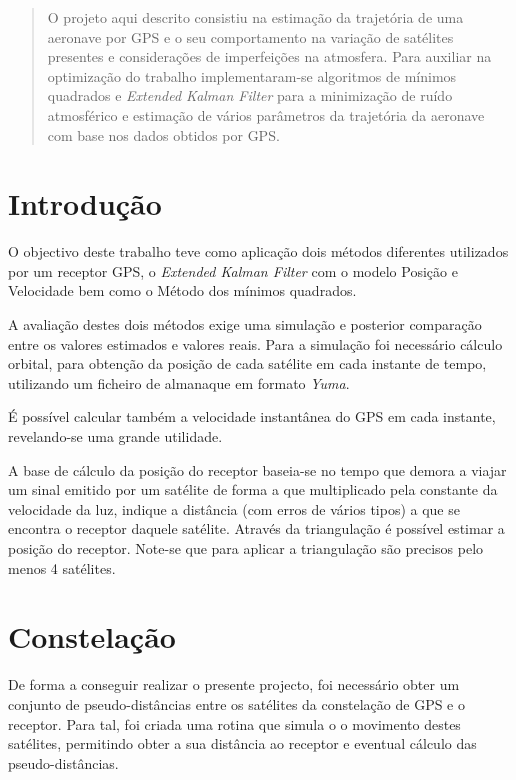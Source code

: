 \documentclass[palatino]{ist-report}
\author{Pedro Afonso \\ \texttt{66277} \and João Manito \\ \texttt{73096}}
\begin{document}
\makecover

\begin{abstract}
    O projeto aqui descrito consistiu na estimação da trajetória de uma aeronave por GPS e o seu comportamento na variação de satélites presentes e considerações de imperfeições na atmosfera. Para auxiliar na optimização do trabalho implementaram-se algoritmos de mínimos quadrados e \textit{Extended Kalman Filter} para a minimização de ruído atmosférico  e estimação de vários parâmetros da trajetória da aeronave com base nos dados obtidos por GPS.
\end{abstract}

{\tableofcontents}

\pagebreak

\section{Introdução}

O objectivo deste trabalho teve como aplicação dois métodos diferentes utilizados por um receptor GPS, o \textit{Extended Kalman Filter} com o modelo Posição e Velocidade bem como o Método dos mínimos quadrados. 

A avaliação destes dois métodos exige uma simulação e posterior comparação entre os valores estimados e valores reais. 
Para a simulação foi necessário cálculo orbital, para obtenção da posição de cada satélite em cada instante de tempo, utilizando um ficheiro de almanaque em formato \textit{Yuma}.

É possível calcular também a velocidade instantânea do GPS em cada instante, revelando-se uma grande utilidade.

A base de cálculo da posição do receptor baseia-se no tempo que demora a viajar um sinal emitido por um satélite de forma a que multiplicado pela constante da velocidade da luz, indique a distância (com erros de vários tipos) a que se encontra o receptor daquele satélite. Através da triangulação é possível estimar a posição do receptor. Note-se que para aplicar a triangulação são precisos pelo menos 4 satélites.

\pagebreak

\section{Constelação}
De forma a conseguir realizar o presente projecto, foi necessário obter um conjunto de pseudo-distâncias  entre os satélites da constelação de GPS e o receptor. Para tal, foi criada uma rotina que simula o o movimento destes satélites, permitindo obter a sua distância ao receptor e eventual cálculo das pseudo-distâncias.
\end{document}

